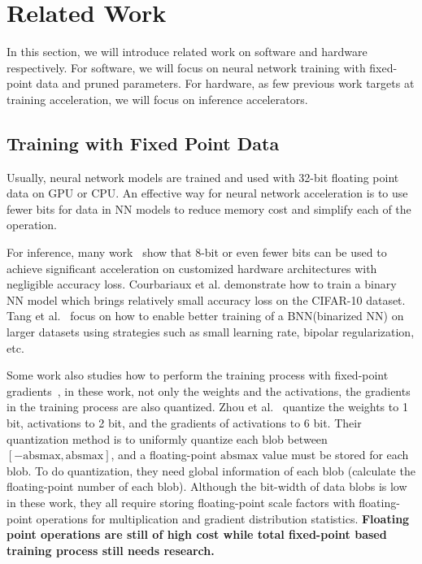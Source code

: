 \section{Related Work}\label{sec:related_work}
In this section, we will introduce related work on software and hardware respectively. For software, we will focus on neural network training with fixed-point data and pruned parameters. For hardware, as few previous work targets at training acceleration, we will focus on inference accelerators.

\subsection{Training with Fixed Point Data}
Usually, neural network models are trained and used with 32-bit floating point data on GPU or CPU. An effective way for neural network acceleration is to use fewer bits for data in NN models to reduce memory cost and simplify each of the operation.

For inference, many work~\cite{han2016eie,qiu2016going} show that 8-bit or even fewer bits can be used to achieve significant acceleration on customized hardware architectures with negligible accuracy loss. Courbariaux et al.\cite{NIPS2016_6573} demonstrate how to train a binary NN model which brings relatively small accuracy loss on the CIFAR-10 dataset. Tang et al.~\cite{Tang2017HowTT} focus on how to enable better training of a BNN(binarized NN) on larger datasets using strategies such as small learning rate, bipolar regularization, etc.

Some work also studies how to perform the training process with fixed-point gradients~\cite{NIPS2016_6573,Hubara2016Quantitized,Zhou2016DoReFa}, in these work, not only the weights and the activations, the gradients in the training process are also quantized. Zhou et al.~\cite{Zhou2016DoReFa} quantize the weights to 1 bit, activations to 2 bit, and the gradients of activations to 6 bit. Their quantization method is to uniformly quantize each blob between $[-\mbox{absmax}, \mbox{absmax}]$, and a floating-point $\mbox{absmax}$ value must be stored for each blob. To do quantization, they need global information of each blob (calculate the floating-point number of each blob). Although the bit-width of data blobs is low in these work, they all require storing floating-point scale factors with floating-point operations for multiplication and gradient distribution statistics. {\bf{Floating point operations are still of high cost while total fixed-point based training process still needs research.}}


